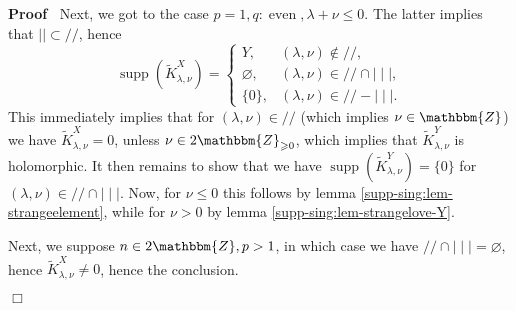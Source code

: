 \documentclass{article}
\newcommand{\nin}{\not\in}
\newcommand{\tmop}[1]{\ensuremath{\operatorname{#1}}}
\renewenvironment{proof}{\noindent\textbf{Proof\ }}{\hspace*{\fill}$\Box$\medskip}
\theoremstyle{remark}
\begin{document}
\begin{proof}
  Next, we got to the case $p = 1, q : \tmop{even}, \lambda + \nu \leqslant
  0$. The latter implies that $\mid \mid \subset / /$, hence
  \[ \tmop{supp} (\tilde{K}_{\lambda, \nu}^X) = \left\{ \begin{array}{ll}
       Y, & (\lambda, \nu) \nin / /,\\
       \varnothing, & (\lambda, \nu) \in / / \cap \mid \mid \mid,\\
       \{ 0 \}, & (\lambda, \nu) \in / / - \mid \mid \mid .
     \end{array} \right. \]
  This immediately implies that for $(\lambda, \nu) \in / /$ (which implies
  $\nu \in \mathbbm{Z}$) we have $\tilde{K}_{\lambda, \nu}^X = 0$, unless $\nu
  \in 2\mathbbm{Z}_{\geqslant 0}$, which implies that $\tilde{K}_{\lambda,
  \nu}^Y$ is holomorphic. It then remains to show that we have $\tmop{supp}
  (\tilde{K}_{\lambda, \nu}^Y) = \{ 0 \}$ for $(\lambda, \nu) \in / / \cap
  \mid \mid \mid$. Now, for $\nu \leqslant 0$ this follows by lemma
  \ref{supp-sing:lem-strangeelement}, while for $\nu > 0$ by lemma
  \ref{supp-sing:lem-strangelove-Y}.
  
  Next, we suppose $n \in 2\mathbbm{Z}, p > 1$, in which case we have $/ /
  \cap \mid \mid \mid = \varnothing$, hence $\tilde{K}_{\lambda, \nu}^X \neq
  0$, hence the conclusion.
  

\end{proof}
\end{document}
